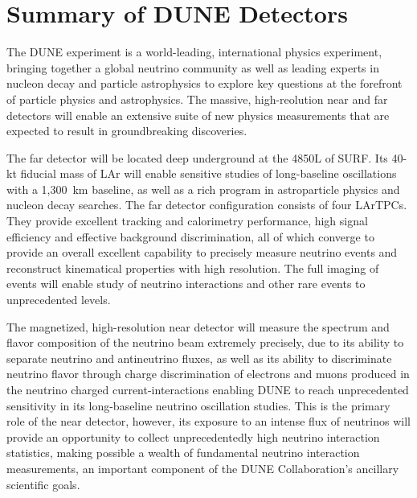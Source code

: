 \chapter{Summary of DUNE Detectors}
\label{ch:detectors-summary}

The DUNE experiment is a world-leading, international physics
experiment, bringing together a global neutrino community as well as
leading experts in nucleon decay and particle astrophysics to explore
key questions at the forefront of particle physics and
astrophysics. The massive, high-reolution near and far detectors will
enable an extensive suite of new physics measurements that are
expected to result in groundbreaking discoveries.

The far detector will be located deep underground at the 4850L of
SURF.  Its 40-kt fiducial mass of LAr will enable sensitive studies of
long-baseline oscillations with a 1,300~km baseline, as well as a rich
program in astroparticle physics and nucleon decay searches.  The far
detector configuration consists of four LArTPCs.  They provide
excellent tracking and calorimetry performance, high signal efficiency
and effective background discrimination, all of which converge to
provide an overall excellent capability to precisely measure neutrino
events and reconstruct kinematical properties with high
resolution. The full imaging of events will enable study of neutrino
interactions and other rare events to unprecedented levels.


The magnetized, high-resolution near detector will measure the
spectrum and flavor composition of the neutrino beam extremely
precisely, due to its ability to separate neutrino and antineutrino
fluxes, as well as its ability to discriminate neutrino flavor through
charge discrimination of electrons and muons produced in the neutrino
charged current-interactions enabling DUNE to reach unprecedented
sensitivity in its long-baseline neutrino oscillation studies.  This
is the primary role of the near detector, however, its exposure to an
intense flux of neutrinos will provide an opportunity to collect
unprecedentedly high neutrino interaction statistics, making possible
a wealth of fundamental neutrino interaction measurements, an
important component of the DUNE Collaboration's ancillary scientific
goals.
